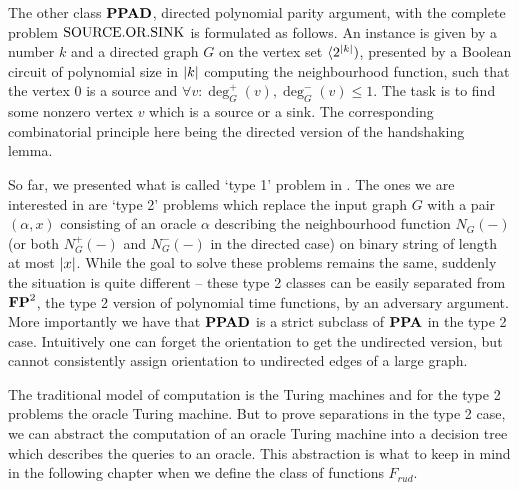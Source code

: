 The other class $\textbf{PPAD}$, directed polynomial parity argument, with the complete problem $\text{SOURCE.OR.SINK}$ is formulated as follows. An instance is given by a number $k$ and a directed graph $G$ on the vertex set $\langle 2^{\left|{k}\right|})$, presented by a Boolean circuit of polynomial size in $\left|{k}\right|$ computing the neighbourhood function, such that the vertex $0$ is a source and $\forall v: \deg_G^+(v),\deg_G^-(v)\leq 1$. The task is to find some nonzero vertex $v$ which is a source or a sink. The corresponding combinatorial principle here being the directed version of the handshaking lemma.

So far, we presented what is called `type 1' problem in \cite{beame1995rel}. The ones we are interested in are `type 2' problems which replace the input graph $G$ with a pair $(\alpha,x)$ consisting of an oracle $\alpha$ describing the neighbourhood function $N_G(-)$ (or both $N_G^+(-)$ and $N_G^-(-)$ in the directed case) on binary string of length at most $\left|{x}\right|$. While the goal to solve these problems remains the same, suddenly the situation is quite different -- these type 2 classes can be easily separated from $\textbf{FP}^2$, the type 2 version of polynomial time functions, by an adversary argument. More importantly we have that $\textbf{PPAD}$ is a strict subclass of $\textbf{PPA}$ in the type 2 case. Intuitively one can forget the orientation to get the undirected version, but cannot consistently assign orientation to undirected edges of a large graph.

The traditional model of computation is the Turing machines and for the type 2 problems the oracle Turing machine. But to prove separations in the type 2 case, we can abstract the computation of an oracle Turing machine into a decision tree which describes the queries to an oracle. This abstraction is what to keep in mind in the following chapter when we define the class of functions $F_{rud}$.
